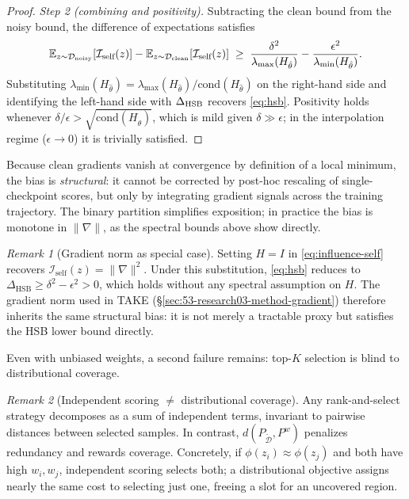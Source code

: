 \documentclass[12pt, a4paper, twoside]{book}
\numberwithin{equation}{chapter}
\theoremstyle{plain}
\theoremstyle{definition}
\theoremstyle{remark}
\newtheorem{remark}{Remark}[chapter]
\newenvironment{foldable}{}{}
\begin{document}
\begin{foldable}
\begin{proof}
        \textit{Step 2 (combining and positivity).}
        Subtracting the clean bound from the noisy bound, the difference of expectations satisfies
        \begin{equation}
            \mathbb{E}_{z \sim \mathcal{D}_\textup{noisy}}[\mathcal{I}_\textup{self}(z)] - \mathbb{E}_{z \sim \mathcal{D}_\textup{clean}}[\mathcal{I}_\textup{self}(z)]
            \;\geq\; \frac{\delta^2}{\lambda_{\max}(H_{\hat\theta})} - \frac{\epsilon^2}{\lambda_{\min}(H_{\hat\theta})}.
        \end{equation}
        Substituting $\lambda_{\min}(H_{\hat\theta}) = \lambda_{\max}(H_{\hat\theta})/\text{cond}(H_{\hat\theta})$ on the right-hand side and identifying the left-hand side with $\Delta_\textup{HSB}$ recovers \eqref{eq:hsb}.
        Positivity holds whenever $\delta/\epsilon > \sqrt{\text{cond}(H_{\hat\theta})}$, which is mild given $\delta \gg \epsilon$; in the interpolation regime ($\epsilon \to 0$) it is trivially satisfied.
    \end{proof}
    Because clean gradients vanish at convergence by definition of a local minimum, the bias is \textit{structural}: it cannot be corrected by post-hoc rescaling of single-checkpoint scores, but only by integrating gradient signals across the training trajectory.
    The binary partition simplifies exposition; in practice the bias is monotone in $\|\nabla\|$, as the spectral bounds above show directly.
    \begin{remark}[Gradient norm as special case] \label{rem:grad-norm}
        Setting $H = I$ in \eqref{eq:influence-self} recovers $\mathcal{I}_\text{self}(z) = \|\nabla\|^2$.
        Under this substitution, \eqref{eq:hsb} reduces to $\Delta_\text{HSB} \geq \delta^2 - \epsilon^2 > 0$, which holds without any spectral assumption on $H$.
        The gradient norm used in TAKE (\S\ref{sec:53-research03-method-gradient}) therefore inherits the same structural bias: it is not merely a tractable proxy but satisfies the \ac{HSB} lower bound directly.
    \end{remark}
\end{foldable}

\begin{foldable} Even with unbiased weights, a second failure remains: top-$K$ selection is blind to distributional coverage.
    \begin{remark}[Independent scoring $\neq$ distributional coverage] \label{rem:coverage}
        Any rank-and-select strategy decomposes as a sum of independent terms, invariant to pairwise distances between selected samples.
        In contrast, $d(P_{\tilde{\mathcal{D}}}, P^w)$ penalizes redundancy and rewards coverage.
        Concretely, if $\phi(z_i) \approx \phi(z_j)$ and both have high $w_i, w_j$, independent scoring selects both; a distributional objective assigns nearly the same cost to selecting just one, freeing a slot for an uncovered region.
    \end{remark}
\end{foldable}
\end{document}
